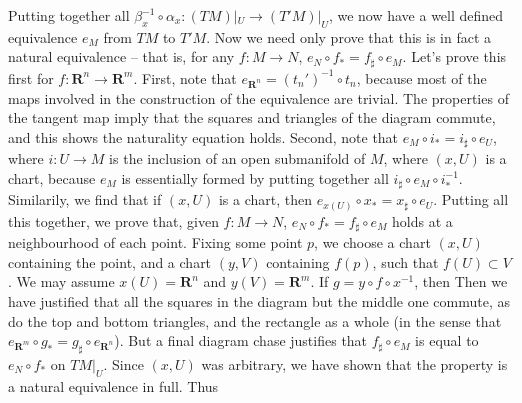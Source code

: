 Putting together all $\beta_x^{-1} \circ \alpha_x: (TM)|_U \to (T'M)|_U$, we now have a well defined equivalence $e_M$ from $TM$ to $T'M$. Now we need only prove that this is in fact a natural equivalence -- that is, for any $f: M \to N$, $e_N \circ f_* = f_\sharp \circ e_M$. Let's prove this first for $f: \mathbf{R}^n \to \mathbf{R}^m$. First, note that $e_{\mathbf{R}^n} = (t_n')^{-1} \circ t_n$, because most of the maps involved in the construction of the equivalence are trivial. The properties of the tangent map imply that the squares and triangles of the diagram
%
%
commute, and this shows the naturality equation holds. Second, note that $e_M \circ i_* = i_\sharp \circ e_U$, where $i: U \to M$ is the inclusion of an open submanifold of $M$, where $(x,U)$ is a chart, because $e_M$ is essentially formed by putting together all $i_\sharp \circ e_M \circ i_*^{-1}$. Similarily, we find that if $(x,U)$ is a chart, then $e_{x(U)} \circ x_* = x_\sharp \circ e_U$. Putting all this together, we prove that, given $f:M \to N$, $e_N \circ f_* = f_\sharp \circ e_M$ holds at a neighbourhood of each point. Fixing some point $p$, we choose a chart $(x,U)$ containing the point, and a chart $(y,V)$ containing $f(p)$, such that $f(U) \subset V$. We may assume $x(U) = \mathbf{R}^n$ and $y(V) = \mathbf{R}^m$. If $g = y \circ f \circ x^{-1}$, then
%
%
Then we have justified that all the squares in the diagram but the middle one commute, as do the top and bottom triangles, and the rectangle as a whole (in the sense that $e_{\mathbf{R}^m} \circ g_* = g_\sharp \circ e_{\mathbf{R}^n}$). But a final diagram chase justifies that $f_\sharp \circ e_M$ is equal to $e_N \circ f_*$ on $TM|_U$. Since $(x,U)$ was arbitrary, we have shown that the property is a natural equivalence in full. Thus

